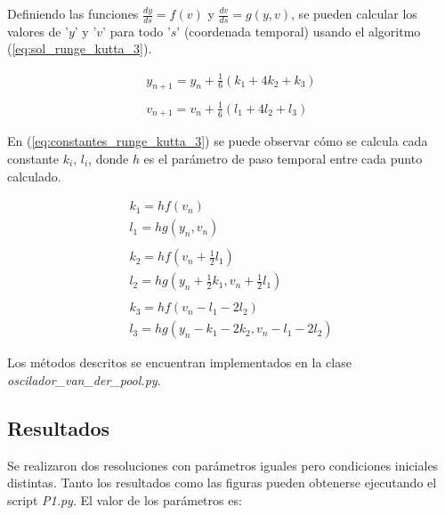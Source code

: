 \documentclass{article}
\begin{document}
Definiendo las funciones $\frac{dy}{ds} = f(v)$ y $\frac{dv}{ds} = g(y,v)$, se pueden calcular los valores de '$y$' y '$v$' para todo '$s$' (coordenada temporal) usando el algoritmo (\ref{eq:sol_runge_kutta_3}).

\begin{equation}
  \begin{array}{l}
    y_{n+1} = y_n + \frac{1}{6}(k_1 + 4 k_2 + k_3) \\ \\
    v_{n+1} = v_n + \frac{1}{6}(l_1 + 4 l_2 + l_3)
  \end{array}
  \label{eq:sol_runge_kutta_3}
\end{equation}

En (\ref{eq:constantes_runge_kutta_3}) se puede observar c\'omo se calcula cada constante $k_i$, $l_i$, donde $h$ es el par\'ametro de paso temporal entre cada punto calculado.

\begin{equation}
  \begin{array}{l}
    k_1 = h f( v_n ) \\
    l_1 = h g( y_n , v_n ) \\ \\
    
    k_2 = h f( v_n + \frac{1}{2} l_1 ) \\
    l_2 = h g( y_n + \frac{1}{2} k_1 , v_n + \frac{1}{2} l_1 ) \\ \\
    
    k_3 = h f( v_n - l_1 - 2 l_2 ) \\
    l_3 = h g( y_n - k_1 - 2 k_2 , v_n - l_1 - 2 l_2 )
    
  \end{array}
  \label{eq:constantes_runge_kutta_3}
\end{equation}

\vspace{0.5cm}
Los m\'etodos descritos se encuentran implementados en la clase \textit{oscilador\_van\_der\_pool.py}.

\subsection{Resultados}

Se realizaron dos resoluciones con par\'ametros iguales pero condiciones iniciales distintas. Tanto los resultados como las figuras pueden obtenerse ejecutando el script \textit{P1.py}. El valor de los par\'ametros es:
\end{document}
